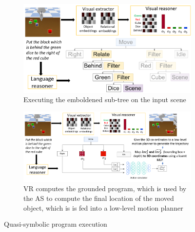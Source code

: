 \begin{figure}
  \centering
  \begin{subfigure}{\textwidth}
      \centering
      \includegraphics[width=\textwidth]{figures/example-1-n.png}
      \caption{Executing the emboldened sub-tree on the input scene}
      \label{fig:approach-1}
  \end{subfigure}

  \vspace{1cm}
  
  \begin{subfigure}{\textwidth}
      \centering
      \includegraphics[width=\textwidth]{figures/example-2-n.png}
      \caption{VR computes the grounded program, which is used by the AS to compute the final location of the moved object, which is is fed into a low-level motion planner}
      \label{fig:approach-2}
  \end{subfigure}
  \caption{Quasi-symbolic program execution}
  \label{fig:approach}
\end{figure}

